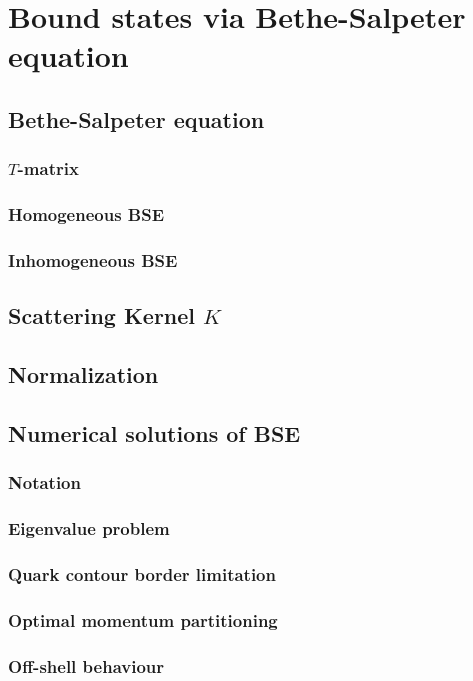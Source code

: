 \chapter{Bound states via Bethe-Salpeter equation}
\label{chap:BSE}

\section{Bethe-Salpeter equation}
	\subsection{$T$-matrix}
	\subsection{Homogeneous BSE}
	\subsection{Inhomogeneous BSE}
\section{Scattering Kernel $K$}
\section{Normalization}
\section{Numerical solutions of BSE}
	\subsection{Notation}
	\subsection{Eigenvalue problem}
	\subsection{Quark contour border limitation}
	\subsection{Optimal momentum partitioning}
	\subsection{Off-shell behaviour}